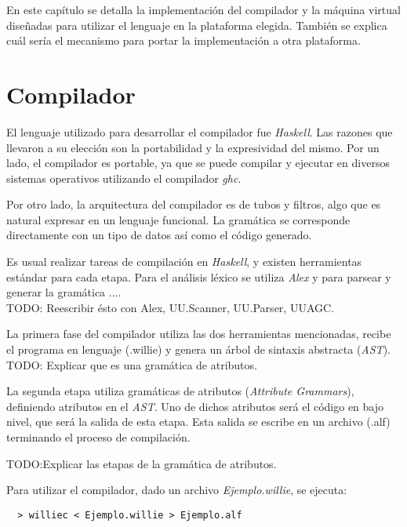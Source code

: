
En este capítulo se detalla la implementación del compilador
y la máquina virtual diseñadas para utilizar el lenguaje
\frob{} en la plataforma elegida.
También se explica cuál sería el mecanismo para portar la
implementación a otra plataforma.


\section{Compilador}

  El lenguaje utilizado para desarrollar el compilador fue \textit{Haskell}.
Las razones que llevaron a su elección son la portabilidad y la expresividad
del mismo.
Por un lado, el compilador es portable, ya que se puede compilar y ejecutar
en diversos sistemas operativos utilizando el compilador \textit{ghc}.

  Por otro lado, la arquitectura del compilador es de tubos y filtros, algo
  que es natural expresar en un lenguaje funcional.
  La gramática se corresponde directamente con un tipo de datos así
  como el código generado.

  Es usual realizar tareas de compilación en \textit{Haskell}, y existen
herramientas estándar para cada etapa.
  Para el análisis léxico se utiliza \textit{Alex} \cite{alex} y
  para parsear y generar la gramática .... \cite{attributegrammars} \\

  TODO: Reescribir ésto con Alex, UU.Scanner, UU.Parser, UUAGC.

  La primera fase del compilador utiliza las dos herramientas mencionadas,
recibe el programa en lenguaje \frob (.willie) y genera un árbol de
sintaxis abstracta (\emph{AST}).\\

  TODO: Explicar que es una gramática de atributos.

  La segunda etapa utiliza gramáticas de atributos (\emph{Attribute Grammars}),
definiendo atributos en el \emph{AST}.
  Uno de dichos atributos será el código en bajo nivel, que será la salida
de esta etapa.
  Esta salida se escribe en un archivo (.alf) terminando el proceso
de compilación.

  TODO:Explicar las etapas de la gramática de atributos.

  Para utilizar el compilador, dado un archivo \textit{Ejemplo.willie}, se
  ejecuta:

  \begin{verbatim}
  > williec < Ejemplo.willie > Ejemplo.alf
  \end{verbatim}

